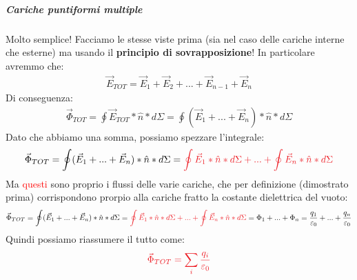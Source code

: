                 \subparagraph{Cariche puntiformi multiple}
                    Molto semplice! Facciamo le stesse viste prima (sia nel caso delle cariche interne che esterne) ma usando il \textbf{principio di sovrapposizione}! In particolare avremmo che:
                    \begin{align*}
                        \vec{E}_{TOT} = \vec{E}_{1}+\vec{E}_{2}+...+\vec{E}_{n-1}+\vec{E}_{n}
                    \end{align*}
                    Di conseguenza:
                    \begin{align*}
                        \vec{\Phi}_{TOT} = \oint \vec{E}_{TOT}*\hat{n}*d\Sigma= \oint(\vec{E}_{1}+...+\vec{E}_{n})*\hat{n}*d\Sigma
                    \end{align*}
                    Dato che abbiamo una somma, possiamo spezzare l'integrale:
                    \begin{align*}
                        \vec{\Phi}_{TOT}=\oint(\vec{E}_{1}+...+\vec{E}_{n})*\hat{n}*d\Sigma=\textcolor{Red}{\oint \vec{E}_{1}*\hat{n}*d\Sigma+...+\oint \vec{E}_{n}*\hat{n}*d\Sigma}
                    \end{align*}
                    Ma \textcolor{Red}{questi} sono proprio i flussi delle varie cariche, che per definizione (dimostrato prima) corrispondono prorpio alla cariche fratto la costante dielettrica del vuoto:
                    \begin{align*}
                        \vec{\Phi}_{TOT}=\oint(\vec{E}_{1}+...+\vec{E}_{n})*\hat{n}*d\Sigma=\textcolor{Red}{\oint \vec{E}_{1}*\hat{n}*d\Sigma+...+\oint \vec{E}_{n}*\hat{n}*d\Sigma}= \Phi_1+...+\Phi_n = \frac{q_1}{\varepsilon_0}+...+\frac{q_n}{\varepsilon_0}
                    \end{align*}
                    Quindi possiamo riassumere il tutto come:
                    \begin{align*}
                        \textcolor{Red}{\vec{\Phi}_{TOT}=\sum_i\frac{q_i}{\varepsilon_0}}
                    \end{align*}